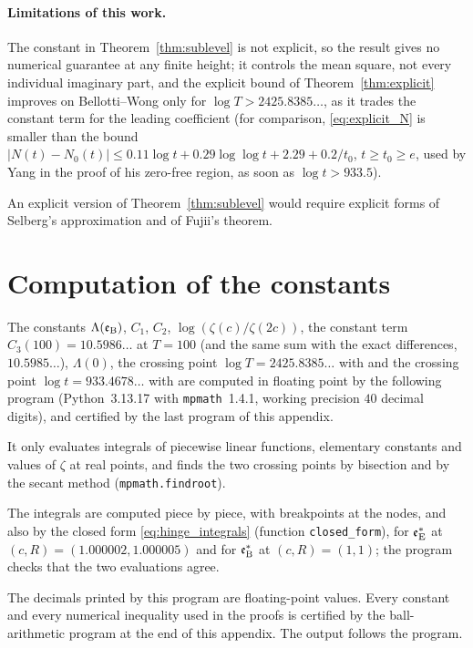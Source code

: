 \documentclass[11pt,a4paper]{article}
\makeatletter
\numberwithin{equation}{section}
\DeclareRobustCommand{\CGref}[1]{\ref{#1}}
\DeclareRobustCommand{\CGeqref}[1]{\eqref{#1}}
\DeclareRobustCommand{\CGcite}[2][]{\if\relax\detokenize{#1}\relax\cite{#2}\else\cite[#1]{#2}\fi}
\let\CG@origref\ref
\let\CG@origeqref\eqref
\newcommand{\CG@gettip}[1]{\@ifundefined{CGTip@#1}{#1}{\csname CGTip@#1\endcsname}}
\newcommand{\CG@getbib}[1]{\@ifundefined{CGBib@#1}{#1}{\csname CGBib@#1\endcsname}}
\DeclareRobustCommand{\CGref}[1]{\pdftooltip{\CG@origref{#1}}{\CG@gettip{#1}}}
\DeclareRobustCommand{\CGeqref}[1]{\pdftooltip{\CG@origeqref{#1}}{\CG@gettip{#1}}}
\DeclareRobustCommand{\CGcite}[2][]{\pdftooltip{\if\relax\detokenize{#1}\relax\cite{#2}\else\cite[#1]{#2}\fi}{\CG@getbib{#2}}}
\theoremstyle{definition}
\theoremstyle{remark}
\newcommand{\Nz}{N_0} %
\newcommand{\eB}{\mathfrak e_{\rm B}}
\newcommand{\eE}{\mathfrak e_{\rm E}}
\makeatother
\begin{document}
\paragraph{Limitations of this work.}
The constant in Theorem~\CGref{thm:sublevel} is not explicit, so the result gives no numerical guarantee at any finite height; it controls the mean square, not every individual imaginary part, and the explicit bound of Theorem~\CGref{thm:explicit} improves on Bellotti--Wong only for $\log T>2425.8385\ldots$, as it trades the constant term for the leading coefficient (for comparison, \CGeqref{eq:explicit_N} is smaller than the bound $|N(t)-\Nz(t)|\le0.11\log t+0.29\log\log t+2.29+0.2/t_0$, $t\ge t_0\ge e$, used by Yang \CGcite[(4.29)]{Yang2024} in the proof of his zero-free region, as soon as $\log t>933.5$).

An explicit version of Theorem~\CGref{thm:sublevel} would require explicit forms of Selberg's approximation and of Fujii's theorem.

\appendix
\section{Computation of the constants}\label{app:code}
The constants $\Lambda(\eB)$, $C_1$, $C_2$, $\log(\zeta(c)/\zeta(2c))$, the constant term $C_3(100)=10.5986\ldots$ at $T=100$ (and the same sum with the exact differences, $10.5985\ldots$), $\Lambda(0)$, the crossing point $\log T=2425.8385\ldots$ with \CGcite{BellottiWong2025} and the crossing point $\log t=933.4678\ldots$ with \CGcite[(4.29)]{Yang2024} are computed in floating point by the following program (Python~3.13.17 with \texttt{mpmath}~1.4.1, working precision $40$ decimal digits), and certified by the last program of this appendix.

It only evaluates integrals of piecewise linear functions, elementary constants and values of $\zeta$ at real points, and finds the two crossing points by bisection and by the secant method (\texttt{mpmath.findroot}).

The integrals are computed piece by piece, with breakpoints at the nodes, and also by the closed form \CGeqref{eq:hinge_integrals} (function \texttt{closed\_form}), for $\eE^*$ at $(c,R)=(1.000002,1.000005)$ and for $\eB^*$ at $(c,R)=(1,1)$; the program checks that the two evaluations agree.

The decimals printed by this program are floating-point values. Every constant and every numerical inequality used in the proofs is certified by the ball-arithmetic program at the end of this appendix. The output follows the program.
\end{document}
